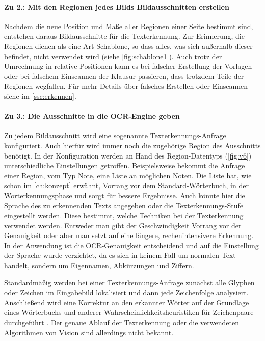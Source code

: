 \documentclass[notables, nomenclature, oneside, 150]{HSMW-Thesis}
\begin{document}
				\paragraph*{Zu 2.: Mit den Regionen jedes Bilds Bildausschnitten erstellen}
				Nachdem die neue Position und Maße aller Regionen einer Seite bestimmt sind, entstehen daraus Bildausschnitte für die Texterkennung. Zur Erinnerung, die Regionen dienen als eine Art Schablone, so dass alles, was sich außerhalb dieser befindet, nicht verwendet wird (siehe \autoref{fig:schablone1}). Auch trotz der Umrechnung in relative Positionen kann es bei falscher Erstellung der Vorlagen oder bei falschem Einscannen der Klausur passieren, dass trotzdem Teile der Regionen wegfallen. Für mehr Details über falsches Erstellen oder Einscannen siehe im \autoref{ssc:erkennen}.
				
				\paragraph*{Zu 3.: Die Ausschnitte in die OCR-Engine geben}
				Zu jedem Bildausschnitt wird eine sogenannte Texterkennungs-Anfrage konfiguriert. Auch hierfür wird immer noch die zugehörige Region des Ausschnitts benötigt. In der Konfiguration werden an Hand des Region-Datentyps (\ref{fig:v6}) unterschiedliche Einstellungen getroffen. Beispielsweise bekommt die Anfrage einer Region, vom Typ Note, eine Liste an möglichen Noten. Die Liste hat, wie schon im \autoref{ch:konzept} erwähnt, Vorrang vor dem Standard-Wörterbuch, in der Worterkennungsphase und sorgt für bessere Ergebnisse. Auch könnte hier die Sprache des zu erkennenden Texts angegeben oder die  Texterkennungs-Stufe eingestellt werden. Diese bestimmt, welche Techniken bei der Texterkennung verwendet werden. Entweder man gibt der Geschwindigkeit Vorrang vor der Genauigkeit oder aber man setzt auf eine längere, rechenintensivere Erkennung. In der Anwendung ist die OCR-Genauigkeit entscheidend und auf die Einstellung der Sprache wurde verzichtet, da es sich in keinem Fall um normalen Text handelt, sondern um Eigennamen, Abkürzungen und Ziffern.
						
				Standardmäßig werden bei einer Texterkennungs-Anfrage zunächst alle Glyphen oder Zeichen im Eingabebild lokalisiert und dann jede Zeichenfolge analysiert. Anschließend wird eine Korrektur an den erkannter Wörter auf der Grundlage eines Wörterbuchs und anderer Wahrscheinlichkeitsheuristiken für Zeichenpaare durchgeführt \cite{apple_text_2019}. Der genaue Ablauf der Texterkennung oder die verwendeten Algorithmen von Vision sind allerdings nicht bekannt. 
				
\end{document}
